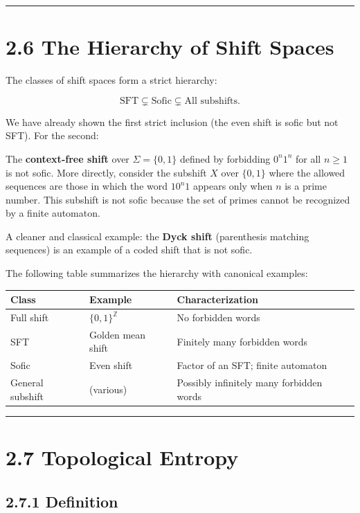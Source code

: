 \bigskip\hrule\bigskip

\section{2.6 The Hierarchy of Shift Spaces}

The classes of shift spaces form a strict hierarchy:

\[
\text{SFT} \subsetneq \text{Sofic} \subsetneq \text{All subshifts}.
\]

We have already shown the first strict inclusion (the even shift is sofic but not SFT). For the second:

\begin{example}
The \textbf{context-free shift} over $\Sigma = \{ 0, 1\} $ defined by forbidding $0^n 1^n$ for all $n \geq 1$ is not sofic. More directly, consider the subshift $X$ over $\{ 0, 1\} $ where the allowed sequences are those in which the word $10^n1$ appears only when $n$ is a prime number. This subshift is not sofic because the set of primes cannot be recognized by a finite automaton.

A cleaner and classical example: the \textbf{Dyck shift} (parenthesis matching sequences) is an example of a coded shift that is not sofic.

The following table summarizes the hierarchy with canonical examples:

\begin{tabular}{|l|l|l|}
\hline
Class & Example & Characterization \\
\hline
Full shift & $\{ 0,1\} ^{\mathbb{Z}}$ & No forbidden words \\
SFT & Golden mean shift & Finitely many forbidden words \\
Sofic & Even shift & Factor of an SFT; finite automaton \\
General subshift & (various) & Possibly infinitely many forbidden words \\
\hline
\end{tabular}


\bigskip\hrule\bigskip
\end{example}

\section{2.7 Topological Entropy}

\subsection{2.7.1 Definition}

